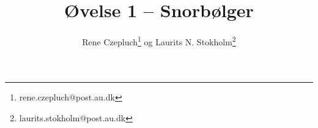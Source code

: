 \documentclass[danish,a4paper,twocolumn, oneside]{memoir}
\title{Øvelse 1 – Snorbølger}
\author{Rene Czepluch\thanks{rene.czepluch@post.au.dk} og Laurits N. Stokholm\thanks{laurits.stokholm@post.au.dk}}
\date
\begin{document}
\maketitle
\noindent






\end{document}
